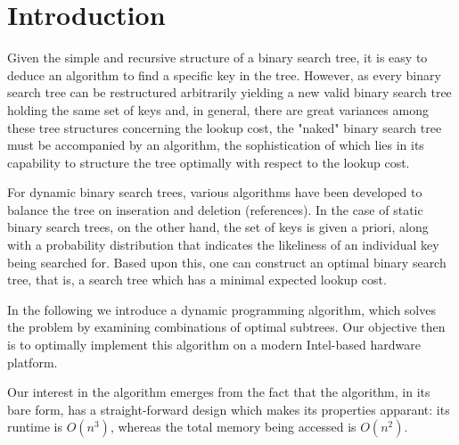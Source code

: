 
\section{Introduction}\label{sec:intro}
Given the simple and recursive structure of a binary search tree, it is easy to
deduce an algorithm to find a specific key in the tree. However, as every binary
search tree can be restructured arbitrarily yielding a new valid binary search
tree holding the same set of keys and, in general, there are great variances
among these tree structures concerning the lookup cost, the "naked"
binary search tree must be accompanied by an algorithm, the sophistication of
which lies in its capability to structure the tree optimally with respect to the
lookup cost.

For dynamic binary search trees, various algorithms have been developed to
balance the tree on inseration and deletion (references). In the case of static
binary search trees, on the other hand, the set of keys is given a priori, along
with a probability distribution that indicates the likeliness of an individual
key being searched for. Based upon this, one can construct an optimal binary
search tree, that is, a search tree which has a minimal expected lookup cost.

In the following we introduce a dynamic programming algorithm, which solves the
problem by examining combinations of optimal subtrees. Our objective then is to
optimally implement this algorithm on a modern Intel-based hardware platform.

Our interest in the algorithm emerges from the fact that the algorithm, in its
bare form, has a straight-forward design which makes its properties apparant:
its runtime is $O(n^3)$, whereas the total memory being accessed is $O(n^2)$.
